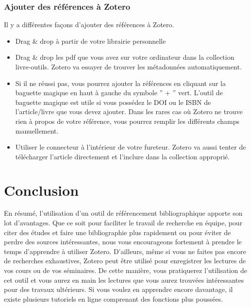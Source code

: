\documentclass[
  letterpaper,
]{scrbook}
\providecommand{\tightlist}{%
  \setlength{\itemsep}{0pt}\setlength{\parskip}{0pt}}\usepackage{longtable,booktabs,array}
\begin{document}
\hypertarget{ajouter-des-ruxe9fuxe9rences-uxe0-zotero}{%
\subsubsection{Ajouter des références à
Zotero}\label{ajouter-des-ruxe9fuxe9rences-uxe0-zotero}}

Il y a différentes façons d'ajouter des références à Zotero.

\begin{itemize}
\tightlist
\item
  Drag \& drop à partir de votre librairie personnelle
\item
  Drag \& drop les pdf que vous avez sur votre ordinateur dans la
  collection livre-outils. Zotero va essayer de trouver les métadonnées
  automatiquement.
\item
  Si il ne réussi pas, vous pourrez ajouter la références en cliquant
  sur la baguette magique en haut à gauche du symbole '' + '' vert.
  L'outil de baguette magique est utile si vous possédez le DOI ou le
  ISBN de l'article/livre que vous devez ajouter. Dans les rares cas où
  Zotero ne trouve rien à propos de votre référence, vous pourrez
  remplir les différents champs manuellement.
\item
  Utiliser le connecteur à l'intérieur de votre fureteur. Zotero va
  aussi tenter de télécharger l'article directement et l'inclure dans la
  collection approprié.
\end{itemize}

\hypertarget{conclusion-1}{%
\section{Conclusion}\label{conclusion-1}}

En résumé, l'utilisation d'un outil de référencement bibliographique
apporte son lot d'avantages. Que ce soit pour faciliter le travail de
recherche en équipe, pour citer des études et faire une bibliographie
plus rapidement ou pour éviter de perdre des sources intéressantes, nous
vous encourageons fortement à prendre le temps d'apprendre à utiliser
Zotero. D'ailleurs, même si vous ne faites pas encore de recherches
exhaustives, Zotero peut être utilisé pour enregistrer les lectures de
vos cours ou de vos séminaires. De cette manière, vous pratiquerez
l'utilisation de cet outil et vous aurez en main les lectures que vous
aurez trouvées intéressantes pour des travaux ultérieurs. Si vous voulez
en apprendre encore davantage, il existe plusieurs tutoriels en ligne
comprenant des fonctions plus poussées.
\end{document}

